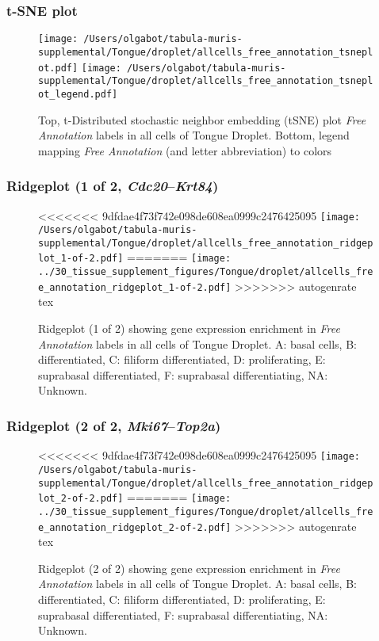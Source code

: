 \clearpage
\subsubsection{t-SNE plot}
\begin{figure}[h]
\centering
\texttt{[image: /Users/olgabot/tabula-muris-supplemental/Tongue/droplet/allcells\_free\_annotation\_tsneplot.pdf]}
\texttt{[image: /Users/olgabot/tabula-muris-supplemental/Tongue/droplet/allcells\_free\_annotation\_tsneplot\_legend.pdf]}
\caption{Top, t-Distributed stochastic neighbor embedding (tSNE) plot  \emph{Free Annotation} labels in all cells of Tongue Droplet. Bottom, legend mapping \emph{Free Annotation} (and letter abbreviation) to colors}
\end{figure}


\clearpage

\subsubsection{Ridgeplot (1 of 2, \emph{Cdc20}--\emph{Krt84})}
\begin{figure}[h]
\centering
<<<<<<< 9dfdae4f73f742e098de608ea0999c2476425095
\texttt{[image: /Users/olgabot/tabula-muris-supplemental/Tongue/droplet/allcells\_free\_annotation\_ridgeplot\_1-of-2.pdf]}
=======
\texttt{[image: ../30\_tissue\_supplement\_figures/Tongue/droplet/allcells\_free\_annotation\_ridgeplot\_1-of-2.pdf]}
>>>>>>> autogenrate tex

\caption{ Ridgeplot (1 of 2)  showing gene expression enrichment in \emph{Free Annotation} labels in all cells of Tongue Droplet. A: basal cells, B: differentiated, C: filiform differentiated, D: proliferating, E: suprabasal differentiated, F: suprabasal differentiating, NA: Unknown.}
\end{figure}


\clearpage

\subsubsection{Ridgeplot (2 of 2, \emph{Mki67}--\emph{Top2a})}
\begin{figure}[h]
\centering
<<<<<<< 9dfdae4f73f742e098de608ea0999c2476425095
\texttt{[image: /Users/olgabot/tabula-muris-supplemental/Tongue/droplet/allcells\_free\_annotation\_ridgeplot\_2-of-2.pdf]}
=======
\texttt{[image: ../30\_tissue\_supplement\_figures/Tongue/droplet/allcells\_free\_annotation\_ridgeplot\_2-of-2.pdf]}
>>>>>>> autogenrate tex

\caption{ Ridgeplot (2 of 2)  showing gene expression enrichment in \emph{Free Annotation} labels in all cells of Tongue Droplet. A: basal cells, B: differentiated, C: filiform differentiated, D: proliferating, E: suprabasal differentiated, F: suprabasal differentiating, NA: Unknown.}
\end{figure}


